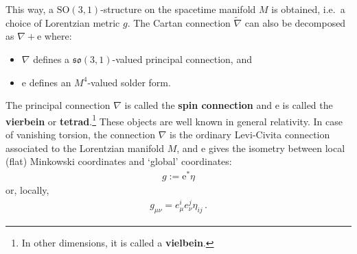     \begin{property}
        This way, a $\mathrm{SO}(3,1)$-structure on the spacetime manifold $M$ is obtained, i.e.~a choice of Lorentzian metric $g$. The Cartan connection $\widetilde{\nabla}$ can also be decomposed as $\nabla+\mathrm{e}$ where:
        \begin{itemize}
            \item $\nabla$ defines a $\mathfrak{so}(3,1)$-valued principal connection, and
            \item $\mathrm{e}$ defines an $M^4$-valued solder form.
        \end{itemize}
        The principal connection $\nabla$ is called the \textbf{spin connection} and $\mathrm{e}$ is called the \textbf{vierbein} or \textbf{tetrad}.\footnote{In other dimensions, it is called a \textbf{vielbein}.} These objects are well known in general relativity. In case of vanishing torsion, the connection $\nabla$ is the ordinary Levi-Civita connection associated to the Lorentzian manifold $M$, and $\mathrm{e}$ gives the isometry between local (flat) Minkowski coordinates and `global' coordinates:
        \begin{gather}
            g := \mathrm{e}^*\eta
        \end{gather}
        or, locally,
        \begin{gather}
            g_{\mu\nu} = e^i_\mu e^j_\nu\eta_{ij}\,.
        \end{gather}
    \end{property}

